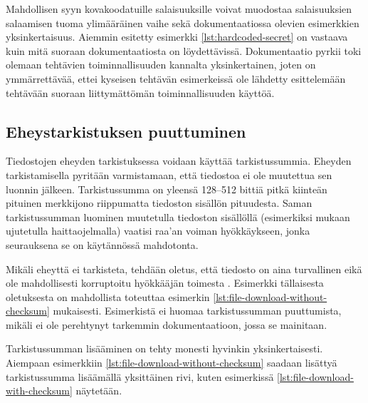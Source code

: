 

Mahdollisen syyn kovakoodatuille salaisuuksille voivat muodostaa salaisuuksien salaamisen
tuoma ylimääräinen vaihe sekä dokumentaatiossa olevien esimerkkien yksinkertaisuus. Aiemmin
esitetty esimerkki \ref{lst:hardcoded-secret} on vastaava kuin mitä suoraan dokumentaatiosta
\parencite{AnsibleDocs} on löydettävissä. Dokumentaatio pyrkii toki olemaan tehtävien
toiminnallisuuden kannalta yksinkertainen, joten on ymmärrettävää, ettei kyseisen tehtävän
esimerkeissä ole lähdetty esittelemään tehtävään suoraan liittymättömän toiminnallisuuden
käyttöä.

\subsection{Eheystarkistuksen puuttuminen}

Tiedostojen eheyden tarkistuksessa voidaan käyttää tarkistussummia. Eheyden tarkistamisella
pyritään varmistamaan, että tiedostoa ei ole muutettua sen luonnin jälkeen. Tarkistussumma
on yleensä 128–512 bittiä pitkä kiinteän pituinen merkkijono riippumatta tiedoston sisällön
pituudesta. Saman tarkistussumman luominen muutetulla tiedoston sisällöllä (esimerkiksi
mukaan ujutetulla haittaojelmalla) vaatisi raa'an voiman hyökkäykseen, jonka seurauksena se
on käytännössä mahdotonta. \parencite{MeylanAlexandre2020ASot}

Mikäli eheyttä ei tarkisteta, tehdään oletus, että tiedosto on aina turvallinen eikä ole
mahdollisesti korruptoitu hyökkääjän toimesta \parencite{RahmanAkond2021SSiA}. Esimerkki
tällaisesta oletuksesta on mahdollista toteuttaa esimerkin
\ref{lst:file-download-without-checksum} mukaisesti. Esimerkistä ei huomaa tarkistussumman
puuttumista, mikäli ei ole perehtynyt tarkemmin dokumentaatioon, jossa se mainitaan.



Tarkistussumman lisääminen on tehty monesti hyvinkin yksinkertaisesti. Aiempaan esimerkkiin
\ref{lst:file-download-without-checksum} saadaan lisättyä tarkistussumma lisäämällä
yksittäinen rivi, kuten esimerkissä \ref{lst:file-download-with-checksum} näytetään.

